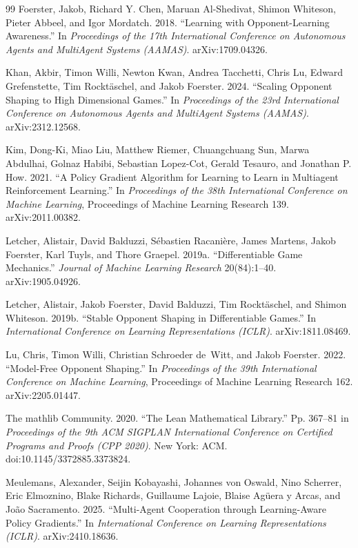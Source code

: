 \documentclass[11pt]{article}
\theoremstyle{remark}
\begin{document}
\begin{thebibliography}{99}
 Foerster, Jakob, Richard Y. Chen, Maruan Al-Shedivat, Shimon Whiteson, Pieter Abbeel, and Igor Mordatch. 2018. ``Learning with Opponent-Learning Awareness.'' In \emph{Proceedings of the 17th International Conference on Autonomous Agents and MultiAgent Systems (AAMAS)}. arXiv:1709.04326.

 Khan, Akbir, Timon Willi, Newton Kwan, Andrea Tacchetti, Chris Lu, Edward Grefenstette, Tim Rockt\"aschel, and Jakob Foerster. 2024. ``Scaling Opponent Shaping to High Dimensional Games.'' In \emph{Proceedings of the 23rd International Conference on Autonomous Agents and MultiAgent Systems (AAMAS)}. arXiv:2312.12568.

 Kim, Dong-Ki, Miao Liu, Matthew Riemer, Chuangchuang Sun, Marwa Abdulhai, Golnaz Habibi, Sebastian Lopez-Cot, Gerald Tesauro, and Jonathan P. How. 2021. ``A Policy Gradient Algorithm for Learning to Learn in Multiagent Reinforcement Learning.'' In \emph{Proceedings of the 38th International Conference on Machine Learning}, Proceedings of Machine Learning Research 139. arXiv:2011.00382.

 Letcher, Alistair, David Balduzzi, S\'ebastien Racani\`ere, James Martens, Jakob Foerster, Karl Tuyls, and Thore Graepel. 2019a. ``Differentiable Game Mechanics.'' \emph{Journal of Machine Learning Research} 20(84):1--40. arXiv:1905.04926.

 Letcher, Alistair, Jakob Foerster, David Balduzzi, Tim Rockt\"aschel, and Shimon Whiteson. 2019b. ``Stable Opponent Shaping in Differentiable Games.'' In \emph{International Conference on Learning Representations (ICLR)}. arXiv:1811.08469.

 Lu, Chris, Timon Willi, Christian Schroeder de~Witt, and Jakob Foerster. 2022. ``Model-Free Opponent Shaping.'' In \emph{Proceedings of the 39th International Conference on Machine Learning}, Proceedings of Machine Learning Research 162. arXiv:2205.01447.

 The mathlib Community. 2020. ``The Lean Mathematical Library.'' Pp. 367--81 in \emph{Proceedings of the 9th ACM SIGPLAN International Conference on Certified Programs and Proofs (CPP 2020)}. New York: ACM. doi:10.1145/3372885.3373824.

 Meulemans, Alexander, Seijin Kobayashi, Johannes von Oswald, Nino Scherrer, Eric Elmoznino, Blake Richards, Guillaume Lajoie, Blaise Ag\"uera y Arcas, and Jo\~ao Sacramento. 2025. ``Multi-Agent Cooperation through Learning-Aware Policy Gradients.'' In \emph{International Conference on Learning Representations (ICLR)}. arXiv:2410.18636.


\end{thebibliography}
\end{document}
